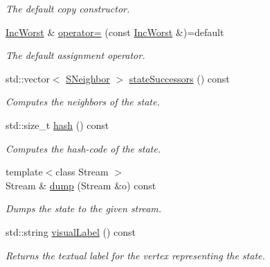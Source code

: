 \begin{DoxyCompactItemize}
\begin{DoxyCompactList}\small\item\em The default copy constructor. \end{DoxyCompactList}\item 
\hyperlink{structslb_1_1ext_1_1domain_1_1incWorst_1_1IncWorst}{Inc\+Worst} \& \hyperlink{structslb_1_1ext_1_1domain_1_1incWorst_1_1IncWorst_a28d6fefe7286d5465c6ddba1efd78451}{operator=} (const \hyperlink{structslb_1_1ext_1_1domain_1_1incWorst_1_1IncWorst}{Inc\+Worst} \&)=default
\begin{DoxyCompactList}\small\item\em The default assignment operator. \end{DoxyCompactList}\item 
std\+::vector$<$ \hyperlink{structslb_1_1ext_1_1domain_1_1incWorst_1_1IncWorst_a87bebe080571b8b793d9747bc36df3b3}{S\+Neighbor} $>$ \hyperlink{structslb_1_1ext_1_1domain_1_1incWorst_1_1IncWorst_a7bab1f2886296d75e0f4ee6b7f011cec}{state\+Successors} () const 
\begin{DoxyCompactList}\small\item\em Computes the neighbors of the state. \end{DoxyCompactList}\item 
std\+::size\+\_\+t \hyperlink{structslb_1_1ext_1_1domain_1_1incWorst_1_1IncWorst_a3aad9c235eff83efe279352aa3e861be}{hash} () const 
\begin{DoxyCompactList}\small\item\em Computes the hash-\/code of the state. \end{DoxyCompactList}\item 
{\footnotesize template$<$class Stream $>$ }\\Stream \& \hyperlink{structslb_1_1ext_1_1domain_1_1incWorst_1_1IncWorst_a40e408e18a47c4a31fa902121833fe06}{dump} (Stream \&o) const 
\begin{DoxyCompactList}\small\item\em Dumps the state to the given stream. \end{DoxyCompactList}\item 
std\+::string \hyperlink{structslb_1_1ext_1_1domain_1_1incWorst_1_1IncWorst_a7bb95f5b25f09bbd0b539f46c57a651c}{visual\+Label} () const 
\begin{DoxyCompactList}\small\item\em Returns the textual label for the vertex representing the state. \end{DoxyCompactList}\item 

\end{DoxyCompactItemize}
